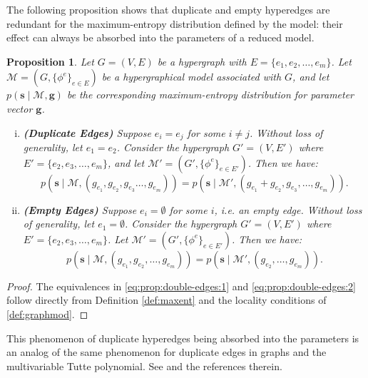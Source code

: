 \documentclass[11pt,reqno]{amsart}
\newcommand{\vecs}{\boldsymbol{s}}
\newcommand{\vecg}{\boldsymbol{g}}
\newcommand{\Mo}{\mathcal{M}}
\theoremstyle{plain}
\newtheorem{proposition}[theorem]{Proposition}
\theoremstyle{definition}
\numberwithin{equation}{section}
\begin{document}
The following proposition shows that duplicate and empty hyperedges are redundant for the maximum-entropy distribution defined by the model: their effect can always be absorbed into the parameters of a reduced model.
\begin{proposition}\label{prop:edge_redundancy}
Let $G = (V,E)$ be a hypergraph with $E = \{e_1, e_2, \dots, e_m\}$. Let $\Mo = (G, \{\phi^e \}_{e \in E})$ be a hypergraphical model associated with $G$, and let $p(\vecs \mid \Mo, \vecg)$ be the corresponding maximum-entropy distribution for parameter vector $\vecg$.

\begin{enumerate}[(i)]
    \item \textbf{(Duplicate Edges)} Suppose $e_i = e_j$ for some $i \neq j$. Without loss of generality, let $e_1 = e_2$. Consider the hypergraph $G' = (V, E')$ where $E' = \{e_2, e_3, \dots, e_m\}$, and let $\Mo' = (G', \{ \phi^e \}_{e \in E'})$. Then we have:
    \begin{equation}\label{eq:prop:double-edges:1}
        p\left(\vecs \mid \Mo, (g_{e_1}, g_{e_2}, g_{e_3} \dots, g_{e_m})\right) = p\left(\vecs \mid \Mo', (g_{e_1} + g_{e_2}, g_{e_3}, \dots, g_{e_m}) \right).
    \end{equation}

    \item \textbf{(Empty Edges)} Suppose $e_i = \emptyset$ for some $i$, i.e. an empty edge. Without loss of generality, let $e_1 = \emptyset$. Consider the hypergraph $G' = (V, E')$ where $E' = \{e_2, e_3, \dots, e_m\}$. Let $\Mo' = (G', \{ \phi^e\}_{e \in E'})$. Then we have:
    \begin{equation}\label{eq:prop:double-edges:2}
        p(\vecs \mid \Mo, (g_{e_1}, g_{e_2}, \dots, g_{e_m})) = p(\vecs \mid \Mo', (g_{e_2}, \dots, g_{e_m})).
    \end{equation}
\end{enumerate}
\end{proposition}

\begin{proof}
The equivalences in \eqref{eq:prop:double-edges:1} and \eqref{eq:prop:double-edges:2} 
follow directly from Definition \ref{def:maxent} and the locality conditions of \ref{def:graphmod}.
\end{proof}

This phenomenon of duplicate hyperedges being absorbed into the parameters is an analog of the same phenomenon for duplicate edges in graphs and the multivariable Tutte polynomial. See \cite{TRALDI2000} and the references therein.
\end{document}
